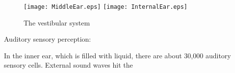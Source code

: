 \documentclass[../main.tex]{subfiles}
\begin{document}
        \begin{figure}[htb]
          \centering
          \texttt{[image: MiddleEar.eps]}
          \texttt{[image: InternalEar.eps]}
          \caption[The vestibular system]{The vestibular system~\cite{BlausenLimbic}}
        \end{figure}

        Auditory sensory perception:

        In the inner ear, which is filled with liquid, there are about 30,000 auditory sensory cells.
        External sound waves hit the 
\end{document}
